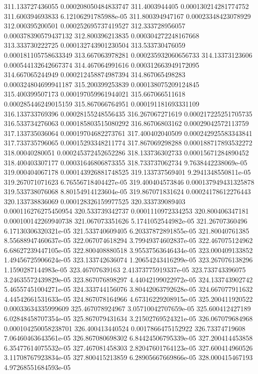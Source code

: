 {311.133727436055 0.000208050484833747
311.4003944405 0.000130214281774752
311.600394693833 6.12106291785988e-05
311.800394947167 0.00023348423078929
312.000395200501 0.000252695737419527
312.333728956057 0.000378390579437132
312.800396213835 0.000304272248167668
313.333730222725 0.000132743901230504
313.533730476059 0.000181105758633349
313.667063978281 0.000235932060656733
314.13373123606 0.000544132642667374
314.467064991616 0.000312663949172095
314.667065244949 0.000212458874987394
314.867065498283 0.000324804699941187
315.200399253839 0.000138075209124845
315.400399507173 0.000197059961944021
315.667066511618 0.000285446249015159
315.867066764951 0.000191181693331109
316.133733769396 0.00028155248556435
316.267067271619 0.000217225251705735
316.533734276063 0.000185803515080292
316.86706803162 0.00029042572113759
317.133735036064 0.00019704682273761
317.400402040509 0.000242925583343841
317.733735796065 0.00015293348211774
317.867069298288 0.000188717893532272
318.00040280051 0.000245372452652286
318.133736302733 0.00015671284890452
318.400403307177 0.00031646806873355
318.733737062734 9.7638442238069e-05
319.000404067178 0.000143926881748525
319.133737569401 9.2941348550811e-05
319.267071071623 6.76556718404427e-05
319.400404573846 0.000137949431325878
319.533738076068 8.80154914123604e-05
319.867071831624 0.00024178612276443
320.133738836069 0.000128326159977525
320.333739089403 0.000116276275450954
320.533739342737 0.0001110972334253
320.800406347181 0.000100142269940738
321.067073351626 5.1741052544982e-05
321.26707360496 6.17130306320321e-05
321.533740609405 6.20337872891855e-05
321.80040761385 8.55688947460637e-05
322.067074618294 3.79949374602837e-05
322.467075124962 6.68627239447105e-05
322.800408880518 3.95537563646434e-05
323.000409133852 1.49456725906624e-05
323.133742636074 1.20654243416299e-05
323.267076138296 1.1590287144983e-05
323.46707639163 2.41373775919337e-05
323.733743396075 3.24635572439829e-05
323.867076898297 4.44042199022972e-05
324.133743902742 5.46557451004271e-05
324.333744156076 3.80442063792628e-05
324.667077911632 4.44542661531633e-05
324.867078164966 4.67316229208915e-05
325.200411920522 0.00033634335999609
325.467078924967 3.05710042707659e-05
325.600412427189 6.02848458707354e-05
325.867079431634 3.21502769524321e-05
326.067079684968 0.000104250058238701
326.400413440524 0.0017866475152922
326.73374719608 7.06460463643561e-05
326.867080698302 6.84424506795339e-05
327.200414453858 6.35477614075532e-05
327.467081458303 2.82047601764123e-05
327.600414960526 3.11708767923834e-05
327.800415213859 6.28905667669866e-05
328.000415467193 4.97268551684593e-05
}
